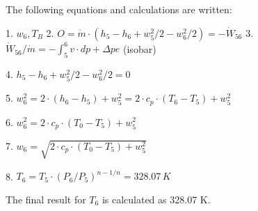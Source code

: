 The following equations and calculations are written:  

1. \( w_6, T_B \)  
2. \( O = \dot{m} \cdot (h_5 - h_6 + w_5^2 / 2 - w_6^2 / 2) = -\dot{W}_{56} \)  
3. \( \dot{W}_{56} / \dot{m} = -\int_5^6 v \cdot dp + \Delta pe \) (isobar)  

4. \( h_5 - h_6 + w_5^2 / 2 - w_6^2 / 2 = 0 \)  

5. \( w_6^2 = 2 \cdot (h_6 - h_5) + w_5^2 = 2 \cdot c_p \cdot (T_6 - T_5) + w_5^2 \)  

6. \( w_6^2 = 2 \cdot c_p \cdot (T_0 - T_5) + w_5^2 \)  

7. \( w_6 = \sqrt{2 \cdot c_p \cdot (T_0 - T_5) + w_5^2} \)  

8. \( T_6 = T_5 \cdot (P_6 / P_5)^{n - 1 / n} = 328.07 \, K \)  

The final result for \( T_6 \) is calculated as 328.07 K.